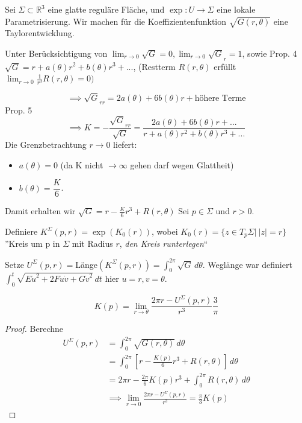\documentclass[../main.tex]{subfiles}
\begin{document}
\begin{application}
Sei $\Sigma \subset \mathbb{R}^3$ eine glatte reguläre Fläche, und $\exp : U \to \Sigma$ eine lokale Parametrisierung.
Wir machen für die Koeffizientenfunktion $\sqrt{G(r,\theta)}$ eine Taylorentwicklung.
\begin{ansatz}
Unter Berücksichtigung von $\lim_{r \to 0}\sqrt{G}=0, \lim_{r \to 0}\sqrt{G}_r=1$, sowie Prop. 4
$\sqrt{G}=r + a (\theta)r^2 + b(\theta)r^3 + ...$, (Restterm $R(r,\theta)$ erfüllt $\lim_{r \to 0}\frac{1}{r^3}R(r,\theta)=0)$

$$\implies \sqrt{G}_{rr}= 2a(\theta) + 6b(\theta)r + \text{höhere Terme}$$
Prop. 5$$ \implies K = - \frac{\sqrt{G}_{rr}}{\sqrt{G}}=\frac{2a(\theta)+6b(\theta)r+ ...}{r + a(\theta)r^2 + b(\theta)r^3 + ...}$$
Die Grenzbetrachtung $r \to 0$ liefert:
\begin{itemize}
    \item $a(\theta)=0$ (da K nicht $\to \infty$ gehen darf wegen Glattheit)
    \item $b(\theta) =\dfrac{K}{6}$.
\end{itemize}
Damit erhalten wir $\sqrt{G}=r- \frac{K}{6}r^3 + R(r,\theta)$
Sei $p\in \Sigma$ und $r >0$.
\begin{definition}
    Definiere $K^{\Sigma}(p,r)=\exp(K_0(r))$, wobei $K_0(r)=\{z\in T_p\Sigma | \ |z|=r\}$\\
    ''Kreis um p in $\Sigma$ mit Radius $r$, \emph{den Kreis runterlegen}``
\end{definition}

\end{ansatz}

Setze $U^{\Sigma}(p,r)=$Länge$(K^{\Sigma}(p,r))= \int_{0}^{2\pi}\sqrt{G}  \,d\theta $. Weglänge war definiert $\int_{0}^{t} \sqrt{E \dot{u}^2+ 2F \dot{u}\dot{v}+G\dot{v}^2 }\,dt $ hier $u =r, v = \theta$.

\end{application}
\begin{theorem}[Umfangdefektformel]
    $$K(p)=\lim_{r \to \theta} \frac{2\pi r - U^{\Sigma}(p,r)}{r^3}\frac{3}{\pi}$$
\end{theorem}
\begin{proof}
    Berechne
    \begin{align*}
        U^{\Sigma}(p,r) &= \int_{0}^{2\pi} \sqrt{G(r,\theta)} \,d\theta  \\ 
        &= \int_{0}^{2\pi}[r- \frac{K(p)}{6}r^3 + R(r,\theta)] \,d\theta \\
        &= 2\pi r -\frac{2\pi}{6}K(p)r^3 + \int_{0}^{2\pi} R(r,\theta) \,d\theta  \\
        & \implies \lim_{r \to 0} \frac{2\pi r - U^{\Sigma}(p,r)}{r^3} = \frac{\pi}{3}K(p)
    \end{align*}
\end{proof}
\end{document}
